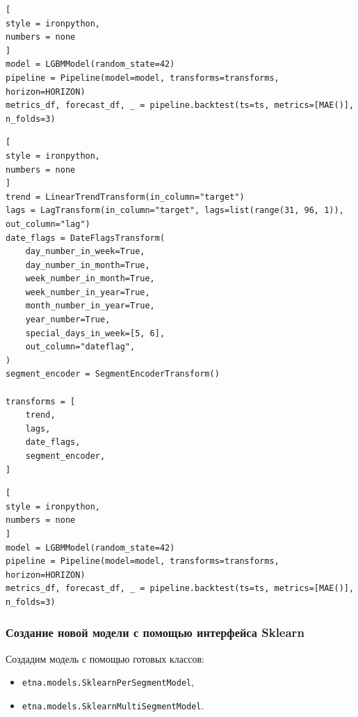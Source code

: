 \documentclass[%
	11pt,
	a4paper,
	utf8,
		]{article}
\begin{document}
\begin{lstlisting}[
style = ironpython,
numbers = none
]
model = LGBMModel(random_state=42)
pipeline = Pipeline(model=model, transforms=transforms, horizon=HORIZON)
metrics_df, forecast_df, _ = pipeline.backtest(ts=ts, metrics=[MAE()], n_folds=3)
\end{lstlisting}

\begin{lstlisting}[
style = ironpython,
numbers = none
]
trend = LinearTrendTransform(in_column="target")
lags = LagTransform(in_column="target", lags=list(range(31, 96, 1)), out_column="lag")
date_flags = DateFlagsTransform(
	day_number_in_week=True,
	day_number_in_month=True,
	week_number_in_month=True,
	week_number_in_year=True,
	month_number_in_year=True,
	year_number=True,
	special_days_in_week=[5, 6],
	out_column="dateflag",
)
segment_encoder = SegmentEncoderTransform()

transforms = [
	trend,
	lags,
	date_flags,
	segment_encoder,
]
\end{lstlisting}

\begin{lstlisting}[
style = ironpython,
numbers = none
]
model = LGBMModel(random_state=42)
pipeline = Pipeline(model=model, transforms=transforms, horizon=HORIZON)
metrics_df, forecast_df, _ = pipeline.backtest(ts=ts, metrics=[MAE()], n_folds=3)
\end{lstlisting}

\subsubsection{Создание новой модели с помощью интерфейса Sklearn}

Создадим модель с помощью готовых классов:
\begin{itemize}
	\item \verb|etna.models.SklearnPerSegmentModel|,
	
	\item \verb|etna.models.SklearnMultiSegmentModel|.
\end{itemize}
\end{document}
